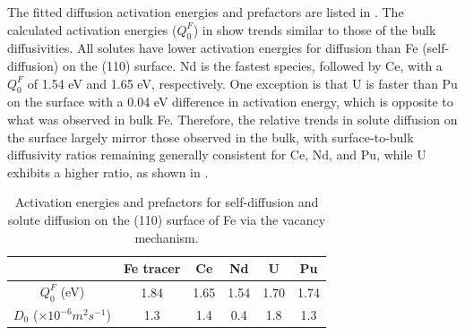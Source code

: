 \documentclass[preprint,12pt]{elsarticle}
\providecommand{\DIFdelbegin}{\protect\color{red}} %
\providecommand{\DIFdelend}{\protect\color{black}} %
\newcommand{\DIFscaledelfig}{0.5}
\newlength{\DIFdelgraphicswidth} %
\newlength{\DIFdelgraphicsheight} %
\newcommand{\DIFdelincludegraphics}[2][]{%
\sbox{\DIFdelgraphicsbox}{\DIFOincludegraphics[#1]{#2}}%
\settoboxwidth{\DIFdelgraphicswidth}{\DIFdelgraphicsbox} %
\settoboxtotalheight{\DIFdelgraphicsheight}{\DIFdelgraphicsbox} %
\scalebox{\DIFscaledelfig}{%
\parbox[b]{\DIFdelgraphicswidth}{\usebox{\DIFdelgraphicsbox}\\[-\baselineskip] \rule{\DIFdelgraphicswidth}{0em}}\llap{\resizebox{\DIFdelgraphicswidth}{\DIFdelgraphicsheight}{%
\setlength{\unitlength}{\DIFdelgraphicswidth}%
\begin{picture}(1,1)%
\thicklines\linethickness{2pt} %
{\color[rgb]{1,0,0}\put(0,0){\framebox(1,1){}}}%
{\color[rgb]{1,0,0}\put(0,0){\line( 1,1){1}}}%
{\color[rgb]{1,0,0}\put(0,1){\line(1,-1){1}}}%
\end{picture}%
}\hspace*{3pt}}} %
} %
\DeclareRobustCommand{\DIFdelbegin}{\DIFOdelbegin \let\includegraphics\DIFdelincludegraphics} %
\DeclareRobustCommand{\DIFdelend}{\DIFOaddend \let\includegraphics\DIFOincludegraphics} %
\begin{document}
The fitted diffusion activation energies and prefactors are listed in . The calculated activation energies ($Q_0^F$) in  show trends similar to those of the bulk diffusivities. All solutes have lower activation energies for diffusion than Fe (self-diffusion) on the (110) surface. Nd is the fastest species, followed by Ce, with a $Q_0^F$ of 1.54 eV and 1.65 eV, respectively. One exception is that U is faster than Pu on the surface with a 0.04 eV difference in activation energy, which is opposite to what was observed in bulk Fe. Therefore, the relative trends in solute diffusion on the surface largely mirror those observed in the bulk, with surface-to-bulk diffusivity ratios remaining generally consistent for Ce, Nd, and Pu, while U exhibits a higher ratio, as shown in .

\DIFdelbegin %

\DIFdelend \begin{table}[!ht]
    \centering
    \caption{Activation energies and prefactors for self-diffusion and solute diffusion on the (110) surface of Fe via the vacancy mechanism.}
    \begin{tabular}{|c|c|c|c|c|c|}
    \hline
                & Fe tracer & Ce    & Nd    & U     & Pu \\
    \hline
    $Q_0^F$ (eV)& 1.84      & 1.65  &  1.54 & 1.70  & 1.74\\
    $D_0$ ($\times 10^{-6} m^2s^{-1}$)
                & 1.3       & 1.4   & 0.4   & 1.8   & 1.3\\
    \hline
    \end{tabular}
    \label{tab:surface_activation_energies}
\end{table}
\end{document}

